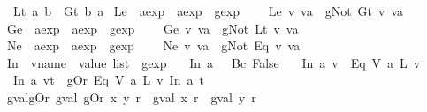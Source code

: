 \begin{isabellebody}
\ \ {\isachardoublequoteopen}Lt\ a\ b\ {\isasymequiv}\ Gt\ b\ a{\isachardoublequoteclose}\isanewline
\isanewline
{}\isamarkupfalse%
\ Le\ {\isacharcolon}{\isacharcolon}\ {\isachardoublequoteopen}aexp\ {\isasymRightarrow}\ aexp\ {\isasymRightarrow}\ gexp{\isachardoublequoteclose}\ \ \isanewline
\ \ {\isachardoublequoteopen}Le\ v\ va\ {\isasymequiv}\ gNot\ {\isacharparenleft}Gt\ v\ va{\isacharparenright}{\isachardoublequoteclose}\isanewline
\isanewline
{}\isamarkupfalse%
\ Ge\ {\isacharcolon}{\isacharcolon}\ {\isachardoublequoteopen}aexp\ {\isasymRightarrow}\ aexp\ {\isasymRightarrow}\ gexp{\isachardoublequoteclose}\ \ \isanewline
\ \ {\isachardoublequoteopen}Ge\ v\ va\ {\isasymequiv}\ gNot\ {\isacharparenleft}Lt\ v\ va{\isacharparenright}{\isachardoublequoteclose}\isanewline
\isanewline
{}\isamarkupfalse%
\ Ne\ {\isacharcolon}{\isacharcolon}\ {\isachardoublequoteopen}aexp\ {\isasymRightarrow}\ aexp\ {\isasymRightarrow}\ gexp{\isachardoublequoteclose}\ \ \isanewline
\ \ {\isachardoublequoteopen}Ne\ v\ va\ {\isasymequiv}\ gNot\ {\isacharparenleft}Eq\ v\ va{\isacharparenright}{\isachardoublequoteclose}\isanewline
\isanewline
{}\isamarkupfalse%
\ In\ {\isacharcolon}{\isacharcolon}\ {\isachardoublequoteopen}vname\ {\isasymRightarrow}\ value\ list\ {\isasymRightarrow}\ gexp{\isachardoublequoteclose}\ \isanewline
\ \ {\isachardoublequoteopen}In\ a\ {\isacharbrackleft}{\isacharbrackright}\ {\isacharequal}\ Bc\ False{\isachardoublequoteclose}\ {\isacharbar}\isanewline
\ \ {\isachardoublequoteopen}In\ a\ {\isacharbrackleft}v{\isacharbrackright}\ {\isacharequal}\ Eq\ {\isacharparenleft}V\ a{\isacharparenright}\ {\isacharparenleft}L\ v{\isacharparenright}{\isachardoublequoteclose}\ {\isacharbar}\isanewline
\ \ {\isachardoublequoteopen}In\ a\ {\isacharparenleft}v{}{\isacharhash}t{\isacharparenright}\ {\isacharequal}\ gOr\ {\isacharparenleft}Eq\ {\isacharparenleft}V\ a{\isacharparenright}\ {\isacharparenleft}L\ v{}{\isacharparenright}{\isacharparenright}\ {\isacharparenleft}In\ a\ t{\isacharparenright}{\isachardoublequoteclose}\isanewline
\isanewline
{}\isamarkupfalse%
\ gval{\isacharunderscore}gOr{\isacharcolon}\ {\isachardoublequoteopen}gval\ {\isacharparenleft}gOr\ x\ y{\isacharparenright}\ r\ {\isacharequal}\ {\isacharparenleft}gval\ x\ r{\isacharparenright}\ {\isasymor}\isactrlsub {\isacharquery}\ {\isacharparenleft}gval\ y\ r{\isacharparenright}{\isachardoublequoteclose}\isanewline

\end{isabellebody}
